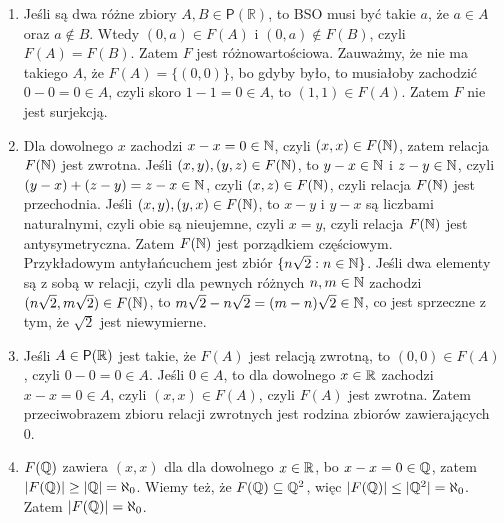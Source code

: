 \documentclass{../note}
\begin{document}
\begin{rozwiazanie}
\begin{enumerate}[label=(\alph*)]
\begin{tikzpicture}[scale=1]
    \end{tikzpicture}
    \item Jeśli są dwa różne zbiory $A, B \in \mathsf{P}(\mathbb{R})$, to BSO musi być takie $a$, że $a \in A$ oraz $a \notin B$. Wtedy $(0, a) \in F(A)$ i $(0, a) \notin F(B)$, czyli $F(A) = F(B)$. Zatem $F$ jest różnowartościowa. Zauważmy, że nie ma takiego $A$, że $F(A) = \{(0, 0)\}$, bo gdyby było, to musiałoby zachodzić $0 - 0 = 0 \in A$, czyli skoro $1-1 = 0 \in A$, to $(1, 1) \in F(A)$. Zatem $F$ nie jest surjekcją.
    \item Dla dowolnego $x$ zachodzi $x - x = 0 \in \mathbb{N}$, czyli $(x, x) \in F(\mathbb{N})$, zatem relacja $F(\mathbb{N})$ jest zwrotna. Jeśli $(x, y), (y, z) \in F(\mathbb{N})$, to $y - x \in \mathbb{N}$ i $z - y \in \mathbb{N}$, czyli $(y - x) + (z - y) = z - x \in \mathbb{N}$, czyli $(x, z) \in F(\mathbb{N})$, czyli relacja $F(\mathbb{N})$ jest przechodnia. Jeśli $(x, y), (y, x) \in F(\mathbb{N})$, to $x - y$ i $y - x$ są liczbami naturalnymi, czyli obie są nieujemne, czyli $x = y$, czyli relacja $F(\mathbb{N})$ jest antysymetryczna. Zatem $F(\mathbb{N})$ jest porządkiem częściowym.\\
    Przykładowym antyłańcuchem jest zbiór $\{n\sqrt2 : n \in \mathbb{N}\}$. Jeśli dwa elementy są z sobą w relacji, czyli dla pewnych różnych $n, m \in \mathbb{N}$ zachodzi $(n\sqrt2, m\sqrt2) \in F(\mathbb{N})$, to $m\sqrt2 - n\sqrt2 = (m - n)\sqrt2 \in \mathbb{N}$, co jest sprzeczne z tym, że $\sqrt2$ jest niewymierne.
    \item Jeśli $A \in \mathsf{P}(\mathbb{R})$ jest takie, że $F(A)$ jest relacją zwrotną, to $(0, 0) \in F(A)$, czyli $0 - 0 = 0 \in A$. Jeśli $0 \in A$, to dla dowolnego $x \in \mathbb{R}$ zachodzi $x - x = 0 \in A$, czyli $(x, x) \in F(A)$, czyli $F(A)$ jest zwrotna. Zatem przeciwobrazem zbioru relacji zwrotnych jest rodzina zbiorów zawierających 0.
    \item $F(\mathbb{Q})$ zawiera $(x, x)$ dla dla dowolnego $x \in \mathbb{R}$, bo $x - x = 0 \in \mathbb{Q}$, zatem $|F(\mathbb{Q})| \geq |\mathbb{Q}| = \aleph_0$. Wiemy też, że $F(\mathbb{Q}) \subseteq \mathbb{Q}^2$, więc $|F(\mathbb{Q})| \leq |\mathbb{Q}^2| = \aleph_0$. Zatem $|F(\mathbb{Q})| = \aleph_0$.
\end{enumerate}
\end{rozwiazanie}
\end{document}
